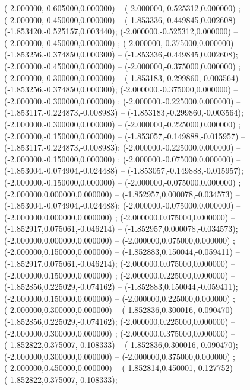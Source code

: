  (-2.000000,-0.605000,0.000000) -- (-2.000000,-0.525312,0.000000) ;
 (-2.000000,-0.450000,0.000000) -- (-1.853336,-0.449845,0.002608) -- (-1.853420,-0.525157,0.003440);
 (-2.000000,-0.525312,0.000000) -- (-2.000000,-0.450000,0.000000) ;
 (-2.000000,-0.375000,0.000000) -- (-1.853256,-0.374850,0.000300) -- (-1.853336,-0.449845,0.002608);
 (-2.000000,-0.450000,0.000000) -- (-2.000000,-0.375000,0.000000) ;
 (-2.000000,-0.300000,0.000000) -- (-1.853183,-0.299860,-0.003564) -- (-1.853256,-0.374850,0.000300);
 (-2.000000,-0.375000,0.000000) -- (-2.000000,-0.300000,0.000000) ;
 (-2.000000,-0.225000,0.000000) -- (-1.853117,-0.224873,-0.008983) -- (-1.853183,-0.299860,-0.003564);
 (-2.000000,-0.300000,0.000000) -- (-2.000000,-0.225000,0.000000) ;
 (-2.000000,-0.150000,0.000000) -- (-1.853057,-0.149888,-0.015957) -- (-1.853117,-0.224873,-0.008983);
 (-2.000000,-0.225000,0.000000) -- (-2.000000,-0.150000,0.000000) ;
 (-2.000000,-0.075000,0.000000) -- (-1.853004,-0.074904,-0.024488) -- (-1.853057,-0.149888,-0.015957);
 (-2.000000,-0.150000,0.000000) -- (-2.000000,-0.075000,0.000000) ;
 (-2.000000,0.000000,0.000000) -- (-1.852957,0.000078,-0.034573) -- (-1.853004,-0.074904,-0.024488);
 (-2.000000,-0.075000,0.000000) -- (-2.000000,0.000000,0.000000) ;
 (-2.000000,0.075000,0.000000) -- (-1.852917,0.075061,-0.046214) -- (-1.852957,0.000078,-0.034573);
 (-2.000000,0.000000,0.000000) -- (-2.000000,0.075000,0.000000) ;
 (-2.000000,0.150000,0.000000) -- (-1.852883,0.150044,-0.059411) -- (-1.852917,0.075061,-0.046214);
 (-2.000000,0.075000,0.000000) -- (-2.000000,0.150000,0.000000) ;
 (-2.000000,0.225000,0.000000) -- (-1.852856,0.225029,-0.074162) -- (-1.852883,0.150044,-0.059411);
 (-2.000000,0.150000,0.000000) -- (-2.000000,0.225000,0.000000) ;
 (-2.000000,0.300000,0.000000) -- (-1.852836,0.300016,-0.090470) -- (-1.852856,0.225029,-0.074162);
 (-2.000000,0.225000,0.000000) -- (-2.000000,0.300000,0.000000) ;
 (-2.000000,0.375000,0.000000) -- (-1.852822,0.375007,-0.108333) -- (-1.852836,0.300016,-0.090470);
 (-2.000000,0.300000,0.000000) -- (-2.000000,0.375000,0.000000) ;
 (-2.000000,0.450000,0.000000) -- (-1.852814,0.450001,-0.127752) -- (-1.852822,0.375007,-0.108333);
